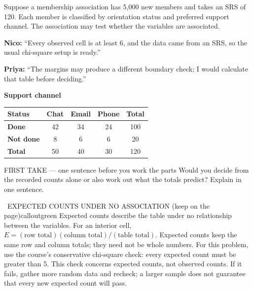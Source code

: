 \documentclass[11pt]{article}
\begin{document}


Suppose a membership association has 5,000 new members and takes an SRS of 120. Each member is classified by orientation status and preferred support channel. The association may test whether the variables are associated.\par\smallskip \textbf{Nico:} ``Every observed cell is at least 6, and the data came from an SRS, so the usual chi-square setup is ready.''\par \textbf{Priya:} ``The margins may produce a different boundary check; I would calculate that table before deciding.''\par
\begin{center}
\textbf{Support channel}\par\smallskip
\begin{tabular}{|l|c|c|c|c|}
\hline
\textbf{Status} & \textbf{Chat} & \textbf{Email} & \textbf{Phone} & \textbf{Total} \\ \hline
\textbf{Done} & 42 & 34 & 24 & 100 \\ \hline
\textbf{Not done} & 8 & 6 & 6 & 20 \\ \hline
\textbf{Total} & 50 & 40 & 30 & 120 \\ \hline
\end{tabular}
\end{center}
\begin{firsttakebox}{FIRST TAKE --- one sentence before you work the parts}
Would you decide from the recorded counts alone or also work out what the totals predict? Explain in one sentence.
\workspace{0.9in}
\end{firsttakebox}

\begin{callout}{\IconBook\ EXPECTED COUNTS UNDER NO ASSOCIATION (keep on the page)}{calloutgreen}
Expected counts describe the table under no relationship between the variables.
For an interior cell, $E=(\text{row total})(\text{column total})/(\text{table total})$.
Expected counts keep the same row and column totals; they need not be whole numbers.
For this problem, use the course's conservative chi-square check: every expected count must be
greater than 5. This check concerns expected counts, not observed counts. If it fails, gather more
random data and recheck; a larger sample does not guarantee that every new expected count will pass.
\end{callout}
\end{document}

